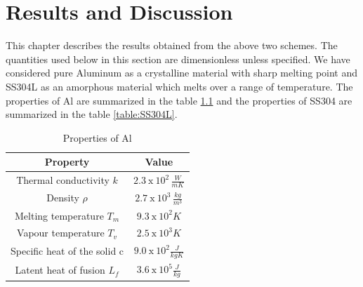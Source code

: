 \chapter{Results and Discussion\label{cha:chapter6}}

This chapter describes the results obtained from the above two schemes. The quantities used below in this section are dimensionless unless specified. 
We have considered pure Aluminum as a crystalline material with sharp melting point and SS304L as an amorphous material which melts over a range of temperature. The properties of Al are summarized in the table \ref{table:AL}\cite{verhoeven2003modelling} and the properties of SS304 are summarized in the table \ref{table:SS304L}\cite{Zhou_2006}. 
\begin{table}[htbp]
    \centering
    \renewcommand{\arraystretch}{1.5} %
    \begin{tabular}{|c|c|}
        \hline
         Property & Value \\
         \hline
         Thermal conductivity $k$ & $2.3 \ \text{x}\ 10^2\, \frac{W}{mK}$\\
         \hline
         Density $\rho$ & $2.7\ \text{x} \ 10^3\, \frac{kg}{m^3}$\\
         \hline
         Melting temperature $T_m$ & $9.3\ \text{x} \ 10^2 K$\\
         \hline
         Vapour temperature $T_v$ & $2.5 \ \text{x} \ 10^3 K$\\
         \hline
         Specific heat of the solid c & $9.0 \ \text{x} \ 10^2 \frac{J}{kg K}$\\
         \hline
         Latent heat of fusion $L_f$ & $3.6 \ \text{x} \ 10^5 \frac{J}{kg}$\\
         \hline
    \end{tabular}
    \caption{Properties of Al}
    \label{table:AL}
\end{table}\\

